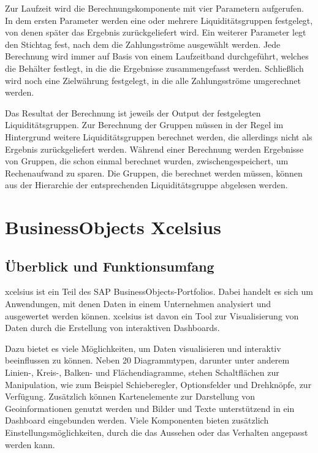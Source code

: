 \begin{onehalfspacing}
\label{sec:berechnungskomponente:parameter}
Zur Laufzeit wird die Berechnungskomponente mit vier Parametern aufgerufen. In dem ersten Parameter werden eine oder mehrere Liquiditätsgruppen festgelegt, von denen später das Ergebnis zurückgeliefert wird. Ein weiterer Parameter legt den Stichtag fest, nach dem die Zahlungsströme ausgewählt werden. Jede Berechnung wird immer auf Basis von einem Laufzeitband durchgeführt, welches die Behälter festlegt, in die die Ergebnisse zusammengefasst werden. Schließlich wird noch eine Zielwährung festgelegt, in die alle Zahlungsströme umgerechnet werden.

Das Resultat der Berechnung ist jeweils der Output der festgelegten Liquiditätsgruppen. Zur Berechnung der Gruppen müssen in der Regel im Hintergrund weitere Liquiditätsgruppen berechnet werden, die allerdings nicht als Ergebnis zurückgeliefert werden. Während einer Berechnung werden Ergebnisse von Gruppen, die schon einmal berechnet wurden, zwischengespeichert, um Rechenaufwand zu sparen. Die Gruppen, die berechnet werden müssen, können aus der Hierarchie der entsprechenden Liquiditätsgruppe abgelesen werden.

\section{BusinessObjects Xcelsius}
\label{sec:xcelsius}
\subsection{Überblick und Funktionsumfang} 
\gls{xcelsius} ist ein Teil des SAP BusinessObjects-Portfolios. Dabei handelt es sich um Anwendungen, mit denen Daten in einem Unternehmen analysiert und ausgewertet werden können. \gls{xcelsius} ist davon ein Tool zur Visualisierung von Daten durch die Erstellung von interaktiven Dashboards.

Dazu bietet es viele Möglichkeiten, um Daten visualisieren und interaktiv beeinflussen zu können. Neben 20 Diagrammtypen, darunter unter anderem Linien-, Kreis-, Balken- und Flächendiagramme, stehen Schaltflächen zur Manipulation, wie zum Beispiel Schieberegler, Optionsfelder und Drehknöpfe, zur Verfügung. Zusätzlich können Kartenelemente zur Darstellung von Geoinformationen genutzt werden und Bilder und Texte unterstützend in ein Dashboard eingebunden werden. Viele Komponenten bieten zusätzlich Einstellungsmöglichkeiten, durch die das Aussehen oder das Verhalten angepasst werden kann.


\end{onehalfspacing}
